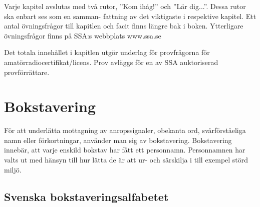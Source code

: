 
Varje kapitel avslutas med två rutor, ”Kom ihåg!” och ”Lär dig...”.
Dessa rutor ska enbart ses som en samman- fattning av det viktigaste i
respektive kapitel. Ett antal övningsfrågor till kapitlen och facit
finns längre bak i boken. Ytterligare övningsfrågor finns på SSA:s
webbplats www.ssa.se

Det totala innehållet i kapitlen utgör underlag för provfrågorna för
amatörradiocertifikat/licens. Prov avläggs för en av SSA auktoriserad
provförrättare.

\section{Bokstavering}

För att underlätta mottagning av anropssignaler, obekanta ord,
svårförståeliga namn eller förkortningar, använder man sig av
bokstavering. Bokstavering innebär, att varje enskild bokstav har fått
ett personnamn. Personnamnen har valts ut med hänsyn till hur lätta de
är att ur- och särskilja i till exempel störd miljö.

\subsection{Svenska bokstaveringsalfabetet}

